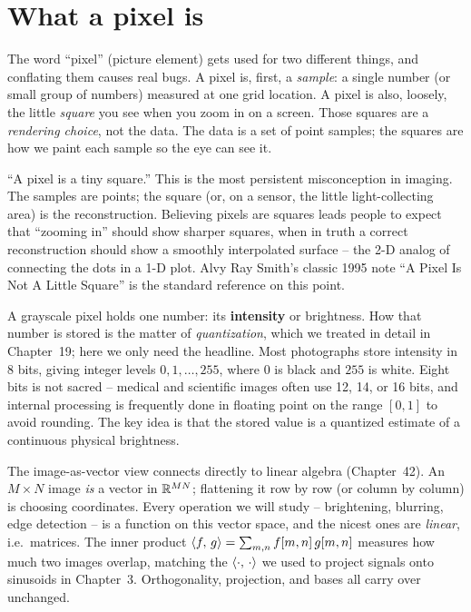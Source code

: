 \section{What a pixel is}
\label{ch30:pixel}

The word ``pixel'' (picture element) gets used for two different things, and
conflating them causes real bugs. A pixel is, first, a \emph{sample}: a single
number (or small group of numbers) measured at one grid location. A pixel is
also, loosely, the little \emph{square} you see when you zoom in on a screen.
Those squares are a \emph{rendering choice}, not the data. The data is a set of
point samples; the squares are how we paint each sample so the eye can see it.

\begin{trapbox}
``A pixel is a tiny square.'' This is the most persistent misconception in
imaging. The samples are points; the square (or, on a sensor, the little
light-collecting area) is the reconstruction. Believing pixels are squares leads
people to expect that ``zooming in'' should show sharper squares, when in truth a
correct reconstruction should show a smoothly interpolated surface -- the 2-D
analog of connecting the dots in a 1-D plot. Alvy Ray Smith's classic 1995 note
``A Pixel Is Not A Little Square'' is the standard reference on this point.
\end{trapbox}

A grayscale pixel holds one number: its \textbf{intensity} or brightness. How
that number is stored is the matter of \emph{quantization}, which we treated
in detail in Chapter~19; here we only need the headline. Most
photographs store intensity in 8 bits, giving integer levels $0,1,\dots,255$,
where $0$ is black and $255$ is white. Eight bits is not sacred -- medical and
scientific images often use 12, 14, or 16 bits, and internal processing is
frequently done in floating point on the range $[0,1]$ to avoid rounding. The
key idea is that the stored value is a quantized estimate of a continuous
physical brightness.

\begin{connectionbox}
The image-as-vector view connects directly to linear algebra (Chapter~42). An
$M\times N$ image \emph{is} a vector in $\mathbb{R}^{MN}$; flattening it row by row (or
column by column) is choosing coordinates. Every operation we will study --
brightening, blurring, edge detection -- is a function on this vector space, and
the nicest ones are \emph{linear}, i.e.\ matrices. The inner product
$\langle f,\, g \rangle=\sum_{m,n} f[m,n]\,g[m,n]$ measures how much two images overlap,
matching the $\langle \cdot,\, \cdot \rangle$ we used to project signals onto sinusoids in
Chapter~3. Orthogonality, projection, and bases all carry
over unchanged.
\end{connectionbox}


